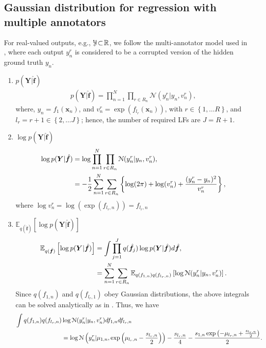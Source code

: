 \documentclass[9pt]{article}
\providecommand{\ve}[1]{{\bm{#1}}}%
\providecommand{\mat}[1]{{\bm{#1}}} %
\newcommand{\Real}{\mathbb{R}}
\providecommand{\s}[1]{\negthinspace#1\negthinspace}%
\providecommand{\ve}[1]{{\mathbf{#1}}}
\providecommand{\mat}[1]{{\mathbf{#1}}}
\newcommand{\gauss}{\mathcal{N}} %
\begin{document}
\subsection{Gaussian distribution for regression with multiple annotators}
For real-valued outputs, e.g., $\mathcal{Y} \s{\subset}\Real$, we follow the multi-annotator model used in \cite{raykar2010learning,groot2011learning,xiao2013learning,rodrigues2017learning}, where each output $y_n^r$ is considered to be a corrupted version of the hidden ground truth $y_n$.
\begin{enumerate}
	\item $ p(\mat{Y}|\hat{\ve{f}})$
	\begin{align}
	p(\mat{Y}|\hat{\ve{f}}) = \prod_{n=1}^{N}\prod_{r\in R_n}\gauss(y_n^r|y_n,v_n^r), 
	\end{align}
	where, $y_n = f_1(\ve{x}_n)$, and $v_n^r = \exp(f_{l_r}(\ve{x}_n))$, with $r\in \left\{1, \dots R\right\}$, and $l_r = r+1 \in \left\{2, \dots J\right\}$; hence, the number of required LFs are $J=R+1$.
	\item $\log p(\mat{Y}|\hat{\ve{f}})$
	\begin{align}
	\notag \log p(\mat{Y}|\hat{\ve{f}}) & = \log \prod_{n=1}^{N}\prod_{r\in R_n}\gauss(y_n^r|y_n,v_n^r), \\
	&= -\frac{1}{2}\sum_{n=1}^{N}\sum_{r\in R_n} \left\{\log(2\pi) + \log(v_n^r) + \frac{(y_n^r - y_n)^2}{v_n^r}  \right\},
	\end{align}
	where $\log v_n^r = \log (\exp(f_{l_r,n})) = f_{l_r,n}$
	\item $\mathbb{E}_{q(\hat{\ve{f}})}\left[\log p(\mat{Y}|\hat{\ve{f}})\right]$
	\begin{align}
	\notag \mathbb{E}_{q(\hat{\ve{f}})}\left[\log p(\mat{Y}|\hat{\ve{f}})\right] &=\int \prod_{j=1}^{J}q(\hat{\ve{f}}_j)\log p(\mat{Y}|\hat{\ve{f}})d\hat{\ve{f}}, \\
	&=\sum_{n=1}^{N}\sum_{r\in R_n}\mathbb{E}_{q(f_{1,n})q(f_{l_r,n})}\left[\log \gauss(y_n^r|y_n,v_n^r)\right].
	\end{align}
	Since $q(f_{1,n})$ and $q(f_{l_r,1})$ obey Gaussian distributions, the above integrals can be solved analytically as in \cite{lazaro2011variational}. Thus, we have
	{
		\begin{align}
		\notag\int q(f_{1,n})q(f_{l_r,n})&\log \gauss(y_n^r|y_n,v_n^r)df_{1,n} df_{l_r,n}\\ 
		&= \log \gauss\left(y_n^r|\mu_{1,n}, \exp\left({\mu_{l_r,n}-\frac{s_{l_r,n}}{2}}\right)\right) - \frac{s_{l_r,n}}{4} - \frac{s_{1,n}\exp\left(-\mu_{l_r,n} + \frac{s_{l_r,n}}{2} \right)}{2}.

\end{align}}
\end{enumerate}
\end{document}
